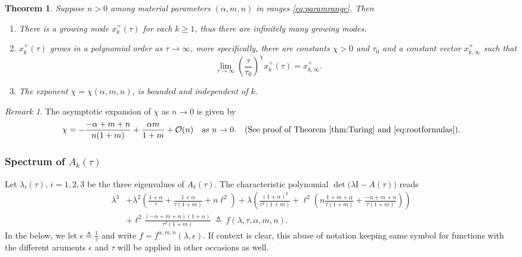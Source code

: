 \documentclass[a4paper,11pt]{article}
\def\l{{\ell}}
\newtheorem{theorem}{Theorem}
\theoremstyle{remark}
\newtheorem{remark}{Remark}[section]
\begin{document}
\begin{theorem} \label{thm:Turing} Suppose $n>0$ among material parameters $(\alpha,m,n)$ in ranges \eqref{eq:paramrange}. Then
  \begin{enumerate}
    \item There is a growing mode $x_k^+(\tau)$ for each $k\ge1$, thus there are  infinitely many growing modes.
    \item $x_k^+(\tau)$ grows in a polynomial order as $\tau \rightarrow \infty$, more specifically, there are constants $\chi>0$ and $\tau_0$ and a constant vector $x_{k,\infty}^+$ such that
    \begin{equation}
      \lim_{\tau \rightarrow \infty} \left(\frac{\tau}{\tau_0}\right)^{\chi} x_k^+(\tau) = x_{k,\infty}^+.
    \end{equation}
    \item The exponent $\chi=\chi(\alpha,m,n)$, is bounded and independent of $k$.
  \end{enumerate}
\end{theorem}
\begin{remark}
 The asymptotic expansion of $\chi$ as $n \rightarrow 0$ is given by
\begin{align*}
 \chi = -\frac{-\alpha+m+n}{n(1+m)} + \frac{\alpha m}{1+m} + \mathcal{O}(n) \quad \text{as } n \rightarrow 0. \quad \text{(See proof of Theorem \ref{thm:Turing} and \eqref{eq:rootformulas})}.%
\end{align*}
\end{remark}
\subsubsection{Spectrum of $A_k(\tau)$}

Let $\lambda_i(\tau)$, $i=1,2,3$ be the three eigenvalues of $A_\ell(\tau)$. %
The characteristic polynomial $\det\big(\lambda \textrm{I} - A(\tau)\big)$ reads
\begin{equation}
\begin{aligned}
 \lambda^3 &+ \lambda^2\left( \tfrac{1+\alpha}{\tau} + \tfrac{1+\alpha}{\tau(1+m)} + n\l^2\right)
 + \lambda\left( \tfrac{(1+\alpha)^2}{\tau^2(1+m)}
 + \l^2\left( n\tfrac{1+m+\alpha}{\tau(1+m)} + \tfrac{-\alpha+m+n}{\tau(1+m)}\right)\right) \\
 &+ \l^2\tfrac{(-\alpha+m+n)(1+\alpha)}{\tau^2(1+m)} \: \triangleq \: f(\lambda,\tau,\alpha,m,n). \label{eq:poly}
\end{aligned}
\end{equation}
In the below, we let $\epsilon\triangleq \frac{1}{\tau}$ and write $f = f^{\alpha,m,n}(\lambda,\epsilon)$. If context is clear, this abuse of notation keeping same symbol for functions with the different aruments $\epsilon$ and $\tau$ will be applied in other occasions as well.
\end{document}
